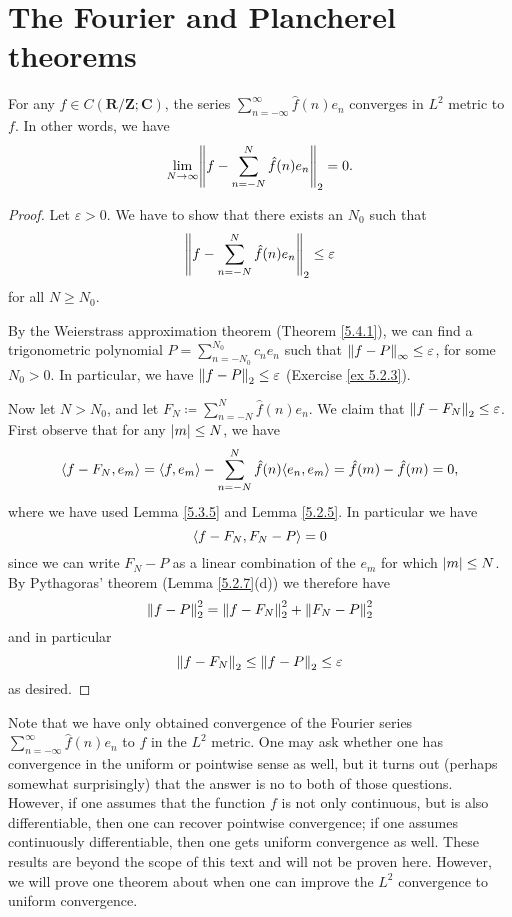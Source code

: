 \section{The Fourier and Plancherel theorems}\label{sec 5.5}

\begin{theorem}\label{5.5.1}
    For any \(f \in C(\mathbf{R} / \mathbf{Z} ; \mathbf{C})\), the series \(\sum_{n = -\infty}^\infty \hat{f}(n) e_n\) converges in \(L^2\) metric to \(f\).
    In other words, we have
    \[
        \lim_{N \to \infty} \norm*{f - \sum_{n = -N}^N \hat{f}(n) e_n}_2 = 0.
    \]
\end{theorem}

\begin{proof}
    Let \(\varepsilon > 0\).
    We have to show that there exists an \(N_0\) such that
    \[
        \norm*{f - \sum_{n = -N}^N \hat{f}(n) e_n}_2 \leq \varepsilon
    \]
    for all \(N \geq N_0\).

    By the Weierstrass approximation theorem (Theorem \ref{5.4.1}), we can find a trigonometric polynomial \(P = \sum_{n = -N_0}^{N_0} c_n e_n\) such that \(\norm*{f - P}_{\infty} \leq \varepsilon\), for some \(N_0 > 0\).
    In particular, we have \(\norm*{f - P}_2 \leq \varepsilon\) (Exercise \ref{ex 5.2.3}).

    Now let \(N > N_0\), and let \(F_N \coloneqq \sum_{n = -N}^N \hat{f}(n) e_n\).
    We claim that \(\norm*{f - F_N}_2 \leq \varepsilon\).
    First observe that for any \(\abs*{m} \leq N\), we have
    \[
        \inner*{f - F_N, e_m} = \inner*{f, e_m} - \sum_{n = -N}^N \hat{f}(n) \inner*{e_n, e_m} = \hat{f}(m) - \hat{f}(m) = 0,
    \]
    where we have used Lemma \ref{5.3.5} and Lemma \ref{5.2.5}.
    In particular we have
    \[
        \inner*{f - F_N, F_N - P} = 0
    \]
    since we can write \(F_N - P\) as a linear combination of the \(e_m\) for which \(\abs*{m} \leq N\).
    By Pythagoras' theorem (Lemma \ref{5.2.7}(d)) we therefore have
    \[
        \norm*{f - P}_2^2 = \norm*{f - F_N}_2^2 + \norm*{F_N - P}_2^2
    \]
    and in particular
    \[
        \norm*{f - F_N}_2 \leq \norm*{f - P}_2 \leq \varepsilon
    \]
    as desired.
\end{proof}

\begin{remark}\label{5.5.2}
    Note that we have only obtained convergence of the Fourier series \(\sum_{n = -\infty}^\infty \hat{f}(n) e_n\) to \(f\) in the \(L^2\) metric.
    One may ask whether one has convergence in the uniform or pointwise sense as well, but it turns out (perhaps somewhat surprisingly) that the answer is no to both of those questions.
    However, if one assumes that the function \(f\) is not only continuous, but is also differentiable, then one can recover pointwise convergence;
    if one assumes continuously differentiable, then one gets uniform convergence as well.
    These results are beyond the scope of this text and will not be proven here.
    However, we will prove one theorem about when one can improve the \(L^2\) convergence to uniform convergence.
\end{remark}

